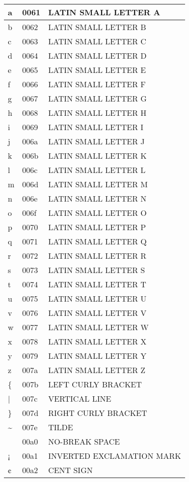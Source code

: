 \documentclass[12pt,letterpaper,openany]{book}
\begin{document}
\begin{center}
\begin{supertabular}{|m{0.25in}|m{0.5in}|m{4in}|}
a & 0061 & LATIN SMALL LETTER A\\\hline
b & 0062 & LATIN SMALL LETTER B\\\hline
c & 0063 & LATIN SMALL LETTER C\\\hline
d & 0064 & LATIN SMALL LETTER D\\\hline
e & 0065 & LATIN SMALL LETTER E\\\hline
f & 0066 & LATIN SMALL LETTER F\\\hline
g & 0067 & LATIN SMALL LETTER G\\\hline
h & 0068 & LATIN SMALL LETTER H\\\hline
i & 0069 & LATIN SMALL LETTER I\\\hline
j & 006a & LATIN SMALL LETTER J\\\hline
k & 006b & LATIN SMALL LETTER K\\\hline
l & 006c & LATIN SMALL LETTER L\\\hline
m & 006d & LATIN SMALL LETTER M\\\hline
n & 006e & LATIN SMALL LETTER N\\\hline
o & 006f & LATIN SMALL LETTER O\\\hline
p & 0070 & LATIN SMALL LETTER P\\\hline
q & 0071 & LATIN SMALL LETTER Q\\\hline
r & 0072 & LATIN SMALL LETTER R\\\hline
s & 0073 & LATIN SMALL LETTER S\\\hline
t & 0074 & LATIN SMALL LETTER T\\\hline
u & 0075 & LATIN SMALL LETTER U\\\hline
v & 0076 & LATIN SMALL LETTER V\\\hline
w & 0077 & LATIN SMALL LETTER W\\\hline
x & 0078 & LATIN SMALL LETTER X\\\hline
y & 0079 & LATIN SMALL LETTER Y\\\hline
z & 007a & LATIN SMALL LETTER Z\\\hline
\{ & 007b & LEFT CURLY BRACKET\\\hline
| & 007c & VERTICAL LINE\\\hline
\} & 007d & RIGHT CURLY BRACKET\\\hline
\textasciitilde & 007e & TILDE\\\hline
  & 00a0 & NO-BREAK SPACE\\\hline
¡ & 00a1 & INVERTED EXCLAMATION MARK\\\hline
¢ & 00a2 & CENT SIGN\\\hline

\end{supertabular}
\end{center}
\end{document}
